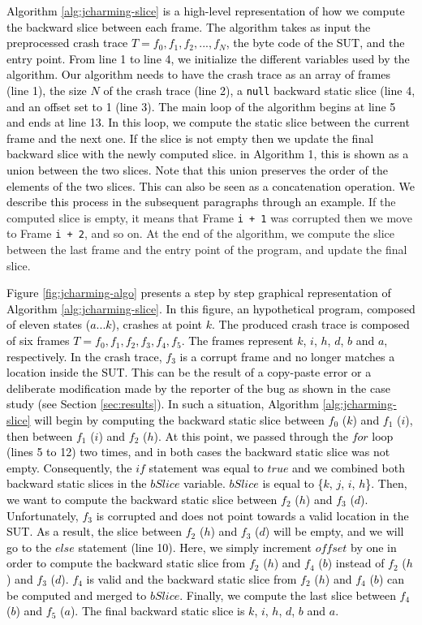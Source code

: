 \documentclass[times, doublespace]{smrauth}
\newcommand{\red}[1]{\textcolor{black}{#1}}
\begin{document}
{\red{Algorithm \ref{alg:jcharming-slice} is a high-level
representation of how we compute the backward slice between
each frame.
The algorithm takes as input the preprocessed
crash trace $T={f_0, f_1, f_2, ..., f_N}$, the byte code of the SUT, and the entry point. From
line 1 to line 4, we initialize the different variables used by the
algorithm.
Our algorithm needs to have the crash trace as an array of frames (line 1), the size $N$ of the crash trace (line 2), a \texttt{null} backward static slice (line 4, and an offset set to 1 (line 3).
The main loop of the algorithm begins at line 5 and
ends at line 13.
In this loop, we compute the static slice
between the current frame and the next one. If the slice is not empty then we update the final backward
slice with the newly computed slice. in Algorithm 1, this is shown as a union between the two slices. Note that this union preserves the order of the elements of the two slices. This can also be seen as a concatenation operation. We describe this process in the subsequent paragraphs through an example.}
If the computed slice is empty, it means that Frame {\tt i + 1}
was corrupted then we move to Frame {\tt i + 2}, and so on.
At the end of the algorithm, we compute the slice between the
last frame and the entry point of the program, and update the
final slice.

\red{Figure \ref{fig:jcharming-algo} presents a step by step graphical representation of Algorithm \ref{alg:jcharming-slice}.
In this figure, an hypothetical program, composed of eleven states ($a...k$), crashes at point $k$.
The produced crash trace is composed of six frames $T={f_0, f_1, f_2, f_3, f_4, f_5}$.
The frames represent $k$, $i$, $h$, $d$, $b$ and $a$, respectively.
In the crash trace, $f_3$ is a corrupt frame and no longer matches a location inside the SUT. This can be the result of a copy-paste error or a deliberate modification made by the reporter of the bug as shown in the case study (see Section \ref{sec:results}).
In such a situation, Algorithm \ref{alg:jcharming-slice} will begin by computing the backward static slice between $f_0$ ($k$) and $f_1$ ($i$), then between  $f_1$ ($i$) and $f_2$ ($h$).
At this point, we passed through the $for$ loop (lines 5 to 12) two times, and in both cases the backward static slice was not empty.
Consequently, the $if$ statement was equal to $true$ and we combined both backward static slices in the $bSlice$ variable.
$bSlice$ is equal to \{$k$, $j$, $i$, $h$\}.
Then, we want to compute the backward static slice between $f_2$ ($h$) and $f_3$ ($d$).
Unfortunately, $f_3$ is corrupted and does not point towards a valid location in the SUT.
As a result, the slice between $f_2$ ($h$) and $f_3$ ($d$) will be empty, and we will go to the $else$ statement (line 10).
Here, we simply increment $offset$ by one in order to compute the backward static slice from $f_2$ ($h$) and $f_4$ ($b$) instead of $f_2$ ($h$) and $f_3$ ($d$).
$f_4$ is valid and the backward static slice from $f_2$ ($h$) and $f_4$ ($b$) can be computed and merged to $bSlice$.
Finally, we compute the last slice between $f_4$ ($b$) and $f_5$ ($a$).
The final backward static slice is $k$, $i$, $h$, $d$, $b$ and $a$.}

}
\end{document}
